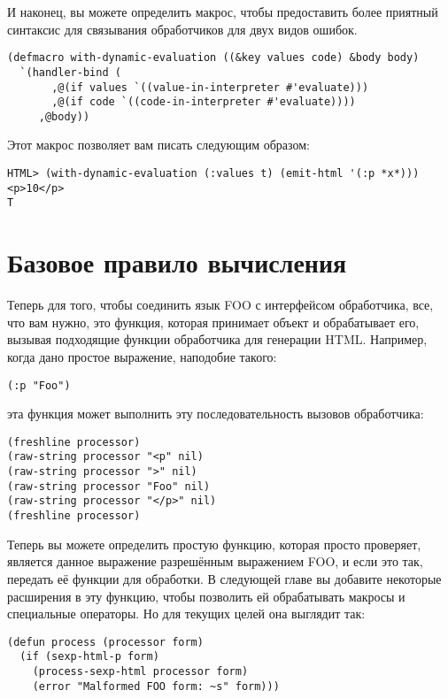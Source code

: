 И наконец, вы можете определить макрос, чтобы предоставить более приятный синтаксис для
связывания обработчиков для двух видов ошибок.

\begin{lstlisting}
(defmacro with-dynamic-evaluation ((&key values code) &body body)
  `(handler-bind (
       ,@(if values `((value-in-interpreter #'evaluate)))
       ,@(if code `((code-in-interpreter #'evaluate))))
     ,@body))
\end{lstlisting}

Этот макрос позволяет вам писать следующим образом: 

\begin{lstlisting}
HTML> (with-dynamic-evaluation (:values t) (emit-html '(:p *x*)))
<p>10</p>
T
\end{lstlisting}


\section{Базовое правило вычисления}

Теперь для того, чтобы соединить язык FOO с интерфейсом обработчика, все, что вам нужно,
это функция, которая принимает объект и обрабатывает его, вызывая подходящие функции
обработчика для генерации HTML. Например, когда дано простое выражение, наподобие такого:

\begin{lstlisting}[style=lisprepl]
  (:p "Foo")
\end{lstlisting}

эта функция может выполнить эту последовательность вызовов обработчика:

\begin{lstlisting}
(freshline processor)
(raw-string processor "<p" nil)
(raw-string processor ">" nil)
(raw-string processor "Foo" nil)
(raw-string processor "</p>" nil)
(freshline processor)
\end{lstlisting}

Теперь вы можете определить простую функцию, которая просто проверяет, является данное
выражение разрешённым выражением FOO, и если это так, передать её функции
 для обработки. В следующей главе вы добавите некоторые расширения
в эту функцию, чтобы позволить ей обрабатывать макросы и специальные операторы. Но для
текущих целей она выглядит так:

\begin{lstlisting}
(defun process (processor form)
  (if (sexp-html-p form)
    (process-sexp-html processor form)
    (error "Malformed FOO form: ~s" form)))
\end{lstlisting}


